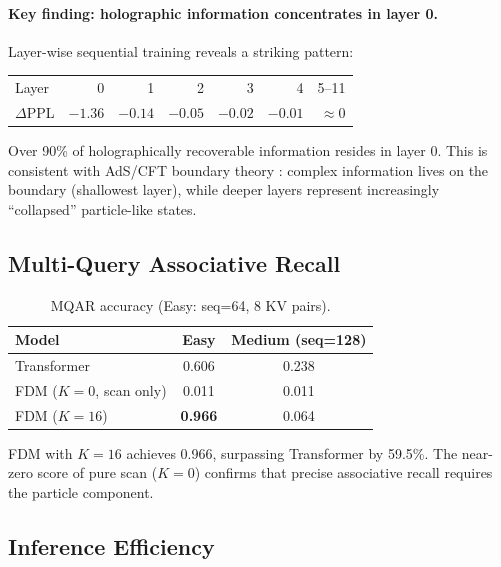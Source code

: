 \documentclass{article}
\begin{document}
\paragraph{Key finding: holographic information concentrates in layer 0.}
Layer-wise sequential training reveals a striking pattern:
\begin{center}
\small
\begin{tabular}{lrrrrrr}
\toprule
Layer & 0 & 1 & 2 & 3 & 4 & 5--11 \\
$\Delta$PPL & $-1.36$ & $-0.14$ & $-0.05$ & $-0.02$ & $-0.01$ & $\approx 0$ \\
\bottomrule
\end{tabular}
\end{center}
Over 90\% of holographically recoverable information resides in layer 0.
This is consistent with AdS/CFT boundary theory
\citep{maldacena1999large}: complex information lives on the boundary
(shallowest layer), while deeper layers represent increasingly
``collapsed'' particle-like states.

\subsection{Multi-Query Associative Recall}

\begin{table}[h]
\centering
\caption{MQAR accuracy (Easy: seq=64, 8 KV pairs).}
\label{tab:mqar}
\begin{tabular}{lcc}
\toprule
Model & Easy & Medium (seq=128) \\
\midrule
Transformer & 0.606 & 0.238 \\
FDM ($K{=}0$, scan only) & 0.011 & 0.011 \\
FDM ($K{=}16$) & \textbf{0.966} & 0.064 \\
\bottomrule
\end{tabular}
\end{table}

FDM with $K{=}16$ achieves 0.966, surpassing Transformer by 59.5\%.
The near-zero score of pure scan ($K{=}0$) confirms that precise
associative recall requires the particle component.

\subsection{Inference Efficiency}
\end{document}
